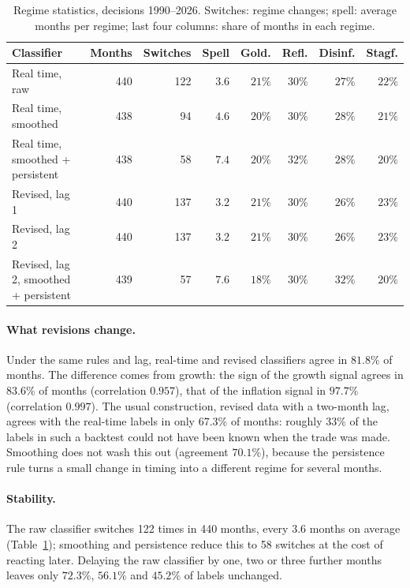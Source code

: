 \documentclass[11pt,a4paper]{article}
\begin{document}
\begin{table}[htbp]
\centering
\caption{Regime statistics, decisions 1990--2026. Switches: regime changes; spell: average months per
regime; last four columns: share of months in each regime.}
\label{tab:spells}
\small
\begin{tabular}{@{}lrrrrrrr@{}}
\toprule
Classifier & Months & Switches & Spell & Gold. & Refl. & Disinf. & Stagf. \\
\midrule
Real time, raw & 440 & 122 & $3.6$ & $21\%$ & $30\%$ & $27\%$ & $22\%$ \\
Real time, smoothed & 438 & 94 & $4.6$ & $20\%$ & $30\%$ & $28\%$ & $21\%$ \\
Real time, smoothed + persistent & 438 & 58 & $7.4$ & $20\%$ & $32\%$ & $28\%$ & $20\%$ \\
Revised, lag 1 & 440 & 137 & $3.2$ & $21\%$ & $30\%$ & $26\%$ & $23\%$ \\
Revised, lag 2 & 440 & 137 & $3.2$ & $21\%$ & $30\%$ & $26\%$ & $23\%$ \\
Revised, lag 2, smoothed + persistent & 439 & 57 & $7.6$ & $18\%$ & $30\%$ & $32\%$ & $20\%$ \\
\bottomrule
\end{tabular}
\end{table}

\paragraph{What revisions change.} Under the same rules and lag, real-time and revised classifiers agree in
$81.8\%$ of months. The difference comes from growth: the sign of the growth signal agrees in
$83.6\%$ of months (correlation $0.957$), that of the inflation signal in $97.7\%$ (correlation
$0.997$). The usual construction, revised data with a two-month lag, agrees with the real-time labels in
only $67.3\%$ of months: roughly $33\%$ of the labels in such a backtest could not have been
known when the trade was made. Smoothing does not wash this out (agreement $70.1\%$), because the
persistence rule turns a small change in timing into a different regime for several months.

\paragraph{Stability.} The raw classifier switches 122 times in 440 months, every
$3.6$ months on average (Table~\ref{tab:spells}); smoothing and persistence reduce this to
58 switches at the cost of reacting later. Delaying the raw classifier by one, two or three further
months leaves only $72.3\%$, $56.1\%$ and $45.2\%$ of labels unchanged.
\end{document}
